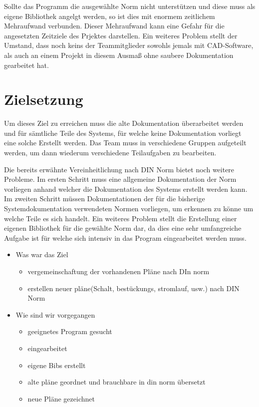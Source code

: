 Sollte das Programm die ausgewählte Norm nicht unterstützen und diese muss als eigene Bibliothek angelgt werden, so ist dies mit enormem zeitlichem Mehraufwand verbunden. Dieser Mehraufwand kann eine Gefahr für die angesetzten Zeitziele des Prjektes darstellen. 
Ein weiteres Problem stellt der Umstand, dass noch keins der Teammitglieder sowohls jemals mit CAD-Software, als auch an einem Projekt in diesem Ausmaß  ohne saubere Dokumentation gearbeitet hat.

\section*{Zielsetzung}


Um dieses Ziel zu erreichen muss die alte Dokumentation überarbeitet werden und für sämtliche Teile des Systems, für welche keine Dokumentation vorliegt eine solche Erstellt werden. Das Team muss in verschiedene Gruppen aufgeteilt werden, um dann wiederum verschiedene Teilaufgaben zu bearbeiten.

  Die bereits erwähnte Vereinheitlichung nach DIN Norm bietet noch weitere Probleme. Im ersten Schritt muss eine allgemeine Dokumentation der Norm vorliegen anhand welcher die Dokumentation des Systems erstellt werden kann. Im zweiten Schritt müssen Dokumentationen der für die bisherige Systemdokumentation verwendeten Normen vorliegen, um erkennen zu könne um welche Teile es sich handelt. Ein weiteres Problem stellt die Erstellung einer eigenen Bibliothek für die gewählte Norm dar, da dies eine sehr umfangreiche Aufgabe ist für welche sich intensiv in das Program eingearbeitet werden muss.

\begin{itemize}
	\item Was war das Ziel
			\begin{itemize}
		\item vergemeinschaftung der vorhandenen Pläne nach DIn norm
		\item erstellen neuer pläne(Schalt, bestückungs, stromlauf, usw.) nach DIN Norm
	\end{itemize}
	\item Wie sind wir vorgegangen
		\begin{itemize}
		\item geeignetes Program gesucht
		\item eingearbeitet
		\item eigene Bibs erstellt
		\item alte pläne geordnet und brauchbare in din norm übersetzt
		\item neue Pläne gezeichnet
	\end{itemize}
\end{itemize}

\





	

